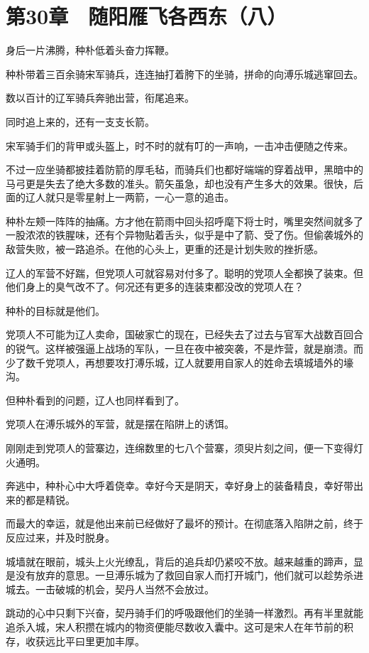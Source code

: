 \section{第30章　随阳雁飞各西东（八）}

身后一片沸腾，种朴低着头奋力挥鞭。

种朴带着三百余骑宋军骑兵，连连抽打着胯下的坐骑，拼命的向溥乐城逃窜回去。

数以百计的辽军骑兵奔驰出营，衔尾追来。

同时追上来的，还有一支支长箭。

宋军骑手们的背甲或头盔上，时不时的就有叮的一声响，一击冲击便随之传来。

不过一应坐骑都披挂着防箭的厚毛毡，而骑兵们也都好端端的穿着战甲，黑暗中的马弓更是失去了绝大多数的准头。箭矢虽急，却也没有产生多大的效果。很快，后面的辽人就只是零星射上一两箭，一心一意的追击。

种朴左颊一阵阵的抽痛。方才他在箭雨中回头招呼麾下将士时，嘴里突然间就多了一股浓浓的铁腥味，还有个异物贴着舌头，似乎是中了箭、受了伤。但偷袭城外的敌营失败，被一路追杀。在他的心头上，更重的还是计划失败的挫折感。

辽人的军营不好踹，但党项人可就容易对付多了。聪明的党项人全都换了装束。但他们身上的臭气改不了。何况还有更多的连装束都没改的党项人在？

种朴的目标就是他们。

党项人不可能为辽人卖命，国破家亡的现在，已经失去了过去与官军大战数百回合的锐气。这样被强逼上战场的军队，一旦在夜中被突袭，不是炸营，就是崩溃。而少了数千党项人，再想要攻打溥乐城，辽人就要用自家人的姓命去填城墙外的壕沟。

但种朴看到的问题，辽人也同样看到了。

党项人在溥乐城外的军营，就是摆在陷阱上的诱饵。

刚刚走到党项人的营寨边，连绵数里的七八个营寨，须臾片刻之间，便一下变得灯火通明。

奔逃中，种朴心中大呼着侥幸。幸好今天是阴天，幸好身上的装备精良，幸好带出来的都是精锐。

而最大的幸运，就是他出来前已经做好了最坏的预计。在彻底落入陷阱之前，终于反应过来，并及时脱身。

城墙就在眼前，城头上火光缭乱，背后的追兵却仍紧咬不放。越来越重的蹄声，显是没有放弃的意思。一旦溥乐城为了救回自家人而打开城门，他们就可以趁势杀进城去。一击破城的机会，契丹人当然不会放过。

跳动的心中只剩下兴奋，契丹骑手们的呼吸跟他们的坐骑一样激烈。再有半里就能追杀入城，宋人积攒在城内的物资便能尽数收入囊中。这可是宋人在年节前的积存，收获远比平曰里更加丰厚。

